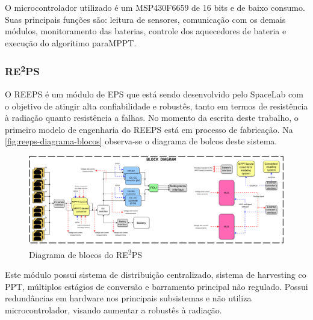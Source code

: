 O microcontrolador utilizado é um MSP430F6659 de 16 bits e de baixo consumo.
Suas principais funções são: leitura de sensores, comunicação com os demais módulos, monitoramento das baterias, controle dos aquecedores de bateria e execução do algorítimo para\gls{MPPT}.


\subsubsection{\texorpdfstring{RE\textsuperscript{2}PS}{REEPS}}


O \gls{REEPS} é um módulo de \gls{EPS} que está sendo desenvolvido pelo SpaceLab com o objetivo de atingir alta confiabilidade e robustês, tanto em termos de resistência à radiação quanto resistência a falhas.
No momento da escrita deste trabalho, o primeiro modelo de engenharia do \gls{REEPS} está em processo de fabricação.
Na \autoref{fig:reeps-diagrama-blocos} observa-se o diagrama de bolcos deste sistema.

\begin{figure}[htp]
    \caption{Diagrama de blocos do RE\textsuperscript{2}PS}
    \begin{center}
        \includegraphics[width=\textwidth, keepaspectratio]{images/reeps-block-diagram.png}
    \end{center}
    \label{fig:reeps-diagrama-blocos}
\end{figure}

Este módulo possui sistema de distribuição centralizado, sistema de harvesting co \gls{PPT}, múltiplos estágios de conversão e barramento principal não regulado.
Possui redundâncias em hardware nos principais subsistemas e não utiliza microcontrolador, visando aumentar a robustês à radiação.

